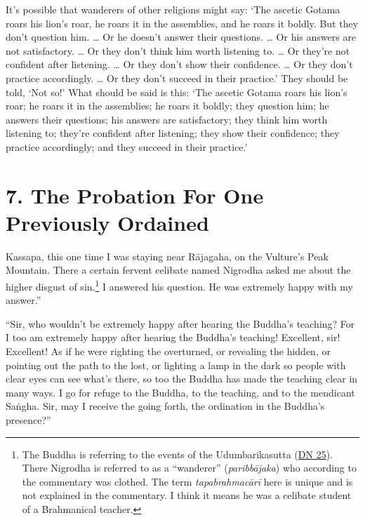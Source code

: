 \documentclass[12pt,openany]{book}%
\begin{document}
It’s possible that wanderers of other religions might say: ‘The ascetic Gotama roars his lion’s roar, he roars it in the assemblies, and he roars it boldly. But they don’t question him. … Or he doesn’t answer their questions. … Or his answers are not satisfactory. … Or they don’t think him worth listening to. … Or they’re not confident after listening. … Or they don’t show their confidence. … Or they don’t practice accordingly. … Or they don’t succeed in their practice.’ They should be told, ‘Not so!’ What should be said is this: ‘The ascetic Gotama roars his lion’s roar; he roars it in the assemblies; he roars it boldly; they question him; he answers their questions; his answers are satisfactory; they think him worth listening to; they’re confident after listening; they show their confidence; they practice accordingly; and they succeed in their practice.’ 

\section*{7. The Probation For One Previously Ordained }

Kassapa, this one time I was staying near \textsanskrit{Rājagaha}, on the Vulture’s Peak Mountain. There a certain fervent celibate named Nigrodha asked me about the higher disgust of sin.\footnote{The Buddha is referring to the events of the Udumbarikasutta (\href{https://suttacentral.net/dn25/en/sujato}{DN 25}). There Nigrodha is referred to as a “wanderer” (\textit{\textsanskrit{paribbājaka}}) who according to the commentary was clothed. The term \textit{\textsanskrit{tapabrahmacārī}} here is unique and is not explained in the commentary. I think it means he was a celibate student of a Brahmanical teacher. } I answered his question. He was extremely happy with my answer.” 

“Sir, who wouldn’t be extremely happy after hearing the Buddha’s teaching? For I too am extremely happy after hearing the Buddha’s teaching! Excellent, sir! Excellent! As if he were righting the overturned, or revealing the hidden, or pointing out the path to the lost, or lighting a lamp in the dark so people with clear eyes can see what’s there, so too the Buddha has made the teaching clear in many ways. I go for refuge to the Buddha, to the teaching, and to the mendicant \textsanskrit{Saṅgha}. Sir, may I receive the going forth, the ordination in the Buddha’s presence?” 
\end{document}
